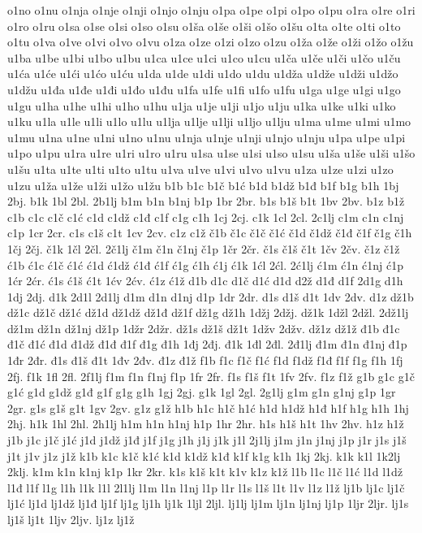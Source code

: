 {o1no
o1nu
o1nja
o1nje
o1nji
o1njo
o1nju
o1pa
o1pe
o1pi
o1po
o1pu
o1ra
o1re
o1ri
o1ro
o1ru
o1sa
o1se
o1si
o1so
o1su
o1ša
o1še
o1ši
o1šo
o1šu
o1ta
o1te
o1ti
o1to
o1tu
o1va
o1ve
o1vi
o1vo
o1vu
o1za
o1ze
o1zi
o1zo
o1zu
o1ža
o1že
o1ži
o1žo
o1žu
u1ba
u1be
u1bi
u1bo
u1bu
u1ca
u1ce
u1ci
u1co
u1cu
u1ča
u1če
u1či
u1čo
u1ču
u1ća
u1će
u1ći
u1ćo
u1ću
u1da
u1de
u1di
u1do
u1du
u1dža
u1dže
u1dži
u1džo
u1džu
u1đa
u1đe
u1đi
u1đo
u1đu
u1fa
u1fe
u1fi
u1fo
u1fu
u1ga
u1ge
u1gi
u1go
u1gu
u1ha
u1he
u1hi
u1ho
u1hu
u1ja
u1je
u1ji
u1jo
u1ju
u1ka
u1ke
u1ki
u1ko
u1ku
u1la
u1le
u1li
u1lo
u1lu
u1lja
u1lje
u1lji
u1ljo
u1lju
u1ma
u1me
u1mi
u1mo
u1mu
u1na
u1ne
u1ni
u1no
u1nu
u1nja
u1nje
u1nji
u1njo
u1nju
u1pa
u1pe
u1pi
u1po
u1pu
u1ra
u1re
u1ri
u1ro
u1ru
u1sa
u1se
u1si
u1so
u1su
u1ša
u1še
u1ši
u1šo
u1šu
u1ta
u1te
u1ti
u1to
u1tu
u1va
u1ve
u1vi
u1vo
u1vu
u1za
u1ze
u1zi
u1zo
u1zu
u1ža
u1že
u1ži
u1žo
u1žu
b1b
b1c
b1č
b1ć
b1d
b1dž
b1đ
b1f
b1g
b1h
1bj
2bj.
b1k
1bl
2bl.
2b1lj
b1m
b1n
b1nj
b1p
1br
2br.
b1s
b1š
b1t
1bv
2bv.
b1z
b1ž
c1b
c1c
c1č
c1ć
c1d
c1dž
c1đ
c1f
c1g
c1h
1cj
2cj.
c1k
1cl
2cl.
2c1lj
c1m
c1n
c1nj
c1p
1cr
2cr.
c1s
c1š
c1t
1cv
2cv.
c1z
c1ž
č1b
č1c
č1č
č1ć
č1d
č1dž
č1đ
č1f
č1g
č1h
1čj
2čj.
č1k
1čl
2čl.
2č1lj
č1m
č1n
č1nj
č1p
1čr
2čr.
č1s
č1š
č1t
1čv
2čv.
č1z
č1ž
ć1b
ć1c
ć1č
ć1ć
ć1d
ć1dž
ć1đ
ć1f
ć1g
ć1h
ć1j
ć1k
1ćl
2ćl.
2ć1lj
ć1m
ć1n
ć1nj
ć1p
1ćr
2ćr.
ć1s
ć1š
ć1t
1ćv
2ćv.
ć1z
ć1ž
d1b
d1c
d1č
d1ć
d1d
d2ž
d1đ
d1f
2d1g
d1h
1dj
2dj.
d1k
2d1l
2d1lj
d1m
d1n
d1nj
d1p
1dr
2dr.
d1s
d1š
d1t
1dv
2dv.
d1z
dž1b
dž1c
dž1č
dž1ć
dž1d
dž1dž
dž1đ
dž1f
dž1g
dž1h
1džj
2džj.
dž1k
1džl
2džl.
2dž1lj
dž1m
dž1n
dž1nj
dž1p
1džr
2džr.
dž1s
dž1š
dž1t
1džv
2džv.
dž1z
dž1ž
đ1b
đ1c
đ1č
đ1ć
đ1d
đ1dž
đ1đ
đ1f
đ1g
đ1h
1đj
2đj.
đ1k
1đl
2đl.
2đ1lj
đ1m
đ1n
đ1nj
đ1p
1đr
2đr.
đ1s
đ1š
đ1t
1đv
2đv.
đ1z
đ1ž
f1b
f1c
f1č
f1ć
f1d
f1dž
f1đ
f1f
f1g
f1h
1fj
2fj.
f1k
1fl
2fl.
2f1lj
f1m
f1n
f1nj
f1p
1fr
2fr.
f1s
f1š
f1t
1fv
2fv.
f1z
f1ž
g1b
g1c
g1č
g1ć
g1d
g1dž
g1đ
g1f
g1g
g1h
1gj
2gj.
g1k
1gl
2gl.
2g1lj
g1m
g1n
g1nj
g1p
1gr
2gr.
g1s
g1š
g1t
1gv
2gv.
g1z
g1ž
h1b
h1c
h1č
h1ć
h1d
h1dž
h1đ
h1f
h1g
h1h
1hj
2hj.
h1k
1hl
2hl.
2h1lj
h1m
h1n
h1nj
h1p
1hr
2hr.
h1s
h1š
h1t
1hv
2hv.
h1z
h1ž
j1b
j1c
j1č
j1ć
j1d
j1dž
j1đ
j1f
j1g
j1h
j1j
j1k
j1l
2j1lj
j1m
j1n
j1nj
j1p
j1r
j1s
j1š
j1t
j1v
j1z
j1ž
k1b
k1c
k1č
k1ć
k1d
k1dž
k1đ
k1f
k1g
k1h
1kj
2kj.
k1k
k1l
1k2lj
2klj.
k1m
k1n
k1nj
k1p
1kr
2kr.
k1s
k1š
k1t
k1v
k1z
k1ž
l1b
l1c
l1č
l1ć
l1d
l1dž
l1đ
l1f
l1g
l1h
l1k
l1l
2l1lj
l1m
l1n
l1nj
l1p
l1r
l1s
l1š
l1t
l1v
l1z
l1ž
lj1b
lj1c
lj1č
lj1ć
lj1d
lj1dž
lj1đ
lj1f
lj1g
lj1h
lj1k
1ljl
2ljl.
lj1lj
lj1m
lj1n
lj1nj
lj1p
1ljr
2ljr.
lj1s
lj1š
lj1t
1ljv
2ljv.
lj1z
lj1ž
}
